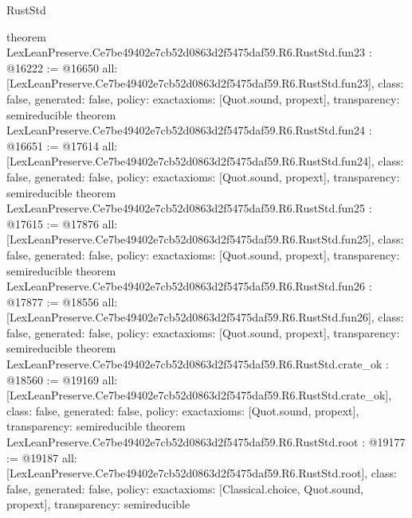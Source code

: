 \begin{lexlean}{RustStd}
\begin{coremodule}
{}
theorem LexLeanPreserve.Ce7be49402e7cb52d0863d2f5475daf59.R6.RustStd.fun23 : @16222 := @16650 {
  all: [LexLeanPreserve.Ce7be49402e7cb52d0863d2f5475daf59.R6.RustStd.fun23],
  class: false,
  generated: false,
  policy: exact{axioms: [Quot.sound, propext]},
  transparency: semireducible
}
theorem LexLeanPreserve.Ce7be49402e7cb52d0863d2f5475daf59.R6.RustStd.fun24 : @16651 := @17614 {
  all: [LexLeanPreserve.Ce7be49402e7cb52d0863d2f5475daf59.R6.RustStd.fun24],
  class: false,
  generated: false,
  policy: exact{axioms: [Quot.sound, propext]},
  transparency: semireducible
}
theorem LexLeanPreserve.Ce7be49402e7cb52d0863d2f5475daf59.R6.RustStd.fun25 : @17615 := @17876 {
  all: [LexLeanPreserve.Ce7be49402e7cb52d0863d2f5475daf59.R6.RustStd.fun25],
  class: false,
  generated: false,
  policy: exact{axioms: [Quot.sound, propext]},
  transparency: semireducible
}
theorem LexLeanPreserve.Ce7be49402e7cb52d0863d2f5475daf59.R6.RustStd.fun26 : @17877 := @18556 {
  all: [LexLeanPreserve.Ce7be49402e7cb52d0863d2f5475daf59.R6.RustStd.fun26],
  class: false,
  generated: false,
  policy: exact{axioms: [Quot.sound, propext]},
  transparency: semireducible
}
theorem LexLeanPreserve.Ce7be49402e7cb52d0863d2f5475daf59.R6.RustStd.crate_ok : @18560 := @19169 {
  all: [LexLeanPreserve.Ce7be49402e7cb52d0863d2f5475daf59.R6.RustStd.crate_ok],
  class: false,
  generated: false,
  policy: exact{axioms: [Quot.sound, propext]},
  transparency: semireducible
}
theorem LexLeanPreserve.Ce7be49402e7cb52d0863d2f5475daf59.R6.RustStd.root : @19177 := @19187 {
  all: [LexLeanPreserve.Ce7be49402e7cb52d0863d2f5475daf59.R6.RustStd.root],
  class: false,
  generated: false,
  policy: exact{axioms: [Classical.choice, Quot.sound, propext]},
  transparency: semireducible
}


\end{coremodule}
\end{lexlean}
